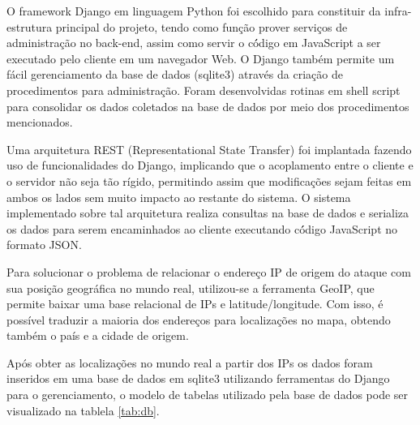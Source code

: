\documentclass[Portuguese]
{ic-tese-v2}
\begin{document}
O framework Django\cite{django} em linguagem Python foi escolhido para constituir da infra-estrutura principal do projeto, tendo como função prover serviços de administração no back-end, assim como servir o có́digo em JavaScript a ser executado pelo cliente em um navegador Web. O Django também permite um fácil gerenciamento da base de dados (sqlite3) através da criação de procedimentos para administração. Foram desenvolvidas rotinas em shell script para consolidar os dados coletados na base de dados por meio dos procedimentos mencionados.

Uma arquitetura REST (Representational State Transfer) foi implantada fazendo uso de funcionalidades do Django, implicando que o acoplamento entre o cliente e o servidor não seja tão rígido, permitindo assim que modificações sejam feitas em ambos os lados sem muito impacto ao restante do sistema. O sistema implementado sobre tal arquitetura realiza consultas na base de dados e serializa os dados para serem encaminhados ao cliente executando có́digo JavaScript no formato JSON.

Para solucionar o problema de relacionar o endereço IP de origem do ataque com sua posição geográfica no mundo real, utilizou-se a ferramenta GeoIP\cite{geoip}, que permite baixar uma base relacional de IPs e latitude/longitude. Com isso, é possível traduzir a maioria dos endereços para localizações no mapa, obtendo também o país e a cidade de origem.

Após obter as localizações no mundo real a partir dos IPs os dados foram inseridos em uma base de dados em sqlite3 utilizando ferramentas do Django para o gerenciamento, o modelo de tabelas utilizado pela base de dados pode ser visualizado na tablela \ref{tab:db}.
\end{document}
